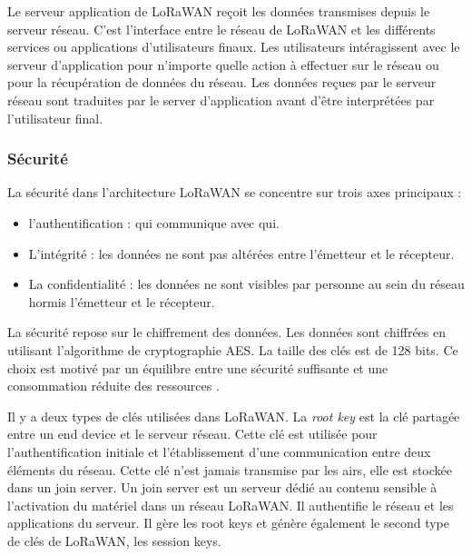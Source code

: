 \vspace{0.1cm}

Le serveur application de LoRaWAN reçoit les données transmises depuis le serveur réseau. C'est l'interface entre le réseau de LoRaWAN et les différents services ou applications d'utilisateurs finaux. Les utilisateurs intéragissent avec le serveur d'application pour n'importe quelle action à effectuer sur le réseau ou pour la récupération de données du réseau. Les données reçues par le serveur réseau sont traduites par le server d'application avant d'être interprétées par l'utilisateur final.

\subsubsection{Sécurité}

La sécurité dans l'architecture LoRaWAN se concentre sur trois axes principaux :

\begin{itemize}
\item l'authentification : qui communique avec qui.
\item L'intégrité : les données ne sont pas altérées entre l'émetteur et le récepteur.
\item La confidentialité : les données ne sont visibles par personne au sein du réseau hormis l'émetteur et le récepteur. 
\end{itemize}

\vspace{0.1cm}

La sécurité repose sur le chiffrement des données. Les données sont chiffrées en utilisant l'algorithme de cryptographie \ac{AES}. La taille des clés est de 128 bits. Ce choix est motivé par un équilibre entre une sécurité suffisante et une consommation réduite des ressources \cite{loraes}.

\vspace{0.1cm}

Il y a deux types de clés utilisées dans LoRaWAN. La \textit{root key} est la clé partagée entre un end device et le serveur réseau. Cette clé est utilisée pour l'authentification initiale et l'établissement d'une communication entre deux éléments du réseau. Cette clé n'est jamais transmise par les airs, elle est stockée dans un join server. Un join server est un serveur dédié au contenu sensible à l'activation du matériel dans un réseau LoRaWAN. Il authentifie le réseau et les applications du serveur. Il gère les root keys et génère également le second type de clés de LoRaWAN, les session keys.

